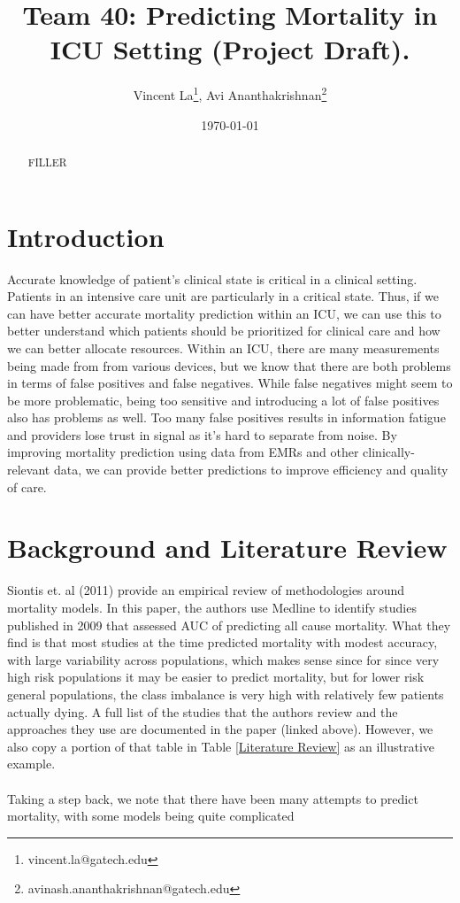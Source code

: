 \documentclass[12pt, final]{article}
\renewcommand{\thefootnote}{$\star$}
\begin{document}
\title{Team 40: Predicting Mortality in ICU Setting (Project Draft).}

\date{\today}

\renewcommand{\thefootnote}{$\dag$}
\author{Vincent La\footnote{vincent.la@gatech.edu}, Avi Ananthakrishnan\footnote{avinash.ananthakrishnan@gatech.edu}}

\maketitle

\begin{abstract}
FILLER
\end{abstract} 

\newpage
\renewcommand{\thefootnote}{\number\value{footnote}} 
\section{Introduction} \label{Introduction}
Accurate knowledge of patient's clinical state is critical in a clinical setting. Patients in an intensive care unit are particularly in a critical state. Thus, if we can have better accurate mortality prediction within an ICU, we can use this to better understand which patients should be prioritized for clinical care and how we can better allocate resources. Within an ICU, there are many measurements being made from from various devices, but we know that there are both problems in terms of false positives and false negatives. While false negatives might seem to be more problematic, being too sensitive and introducing a lot of false positives also has problems as well. Too many false positives results in information fatigue and providers lose trust in signal as it's hard to separate from noise. By improving mortality prediction using data from EMRs and other clinically-relevant data, we can provide better predictions to improve efficiency and quality of care.

\section{Background and Literature Review}
\label{Background and Lit Review}
Siontis et. al (2011) \cite{Siontis} provide an empirical review of methodologies around mortality models. In this paper, the authors use Medline to identify studies published in 2009 that assessed AUC of predicting all cause mortality. What they find is that most studies at the time predicted mortality with modest accuracy, with large variability across populations, which makes sense since for since very high risk populations it may be easier to predict mortality, but for lower risk general populations, the class imbalance is very high with relatively few patients actually dying. A full list of the studies that the authors review and the approaches they use are documented in the paper (linked above). However, we also copy a portion of that table in Table \ref{Literature Review} as an illustrative example.
\\
\\
Taking a step back, we note that there have been many attempts to predict mortality, with some models being quite complicated 
\end{document}
